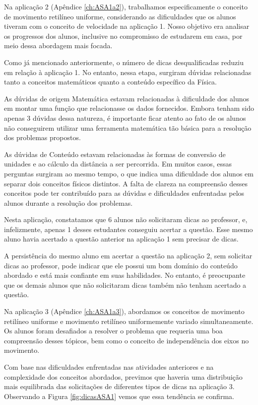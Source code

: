 Na aplicação 2 (Apêndice \ref{ch:ASA1a2}), trabalhamos especificamente o conceito de movimento retilíneo uniforme, considerando as dificuldades que os alunos tiveram com o conceito de velocidade na aplicação 1. Nosso objetivo era analisar os progressos dos alunos, inclusive no compromisso de estudarem em casa, por meio dessa abordagem mais focada.

Como já mencionado anteriormente, o número de dicas desqualificadas reduziu em relação à aplicação 1. No entanto, nessa etapa, surgiram dúvidas relacionadas tanto a conceitos matemáticos quanto a conteúdo específico da Física.

As dúvidas de origem Matemática estavam relacionadas à dificuldade dos alunos em montar uma função que relacionasse os dados fornecidos. Embora tenham sido apenas 3 dúvidas dessa natureza, é importante ficar atento ao fato de os alunos não conseguirem utilizar uma ferramenta matemática tão básica para a resolução dos problemas propostos.

As dúvidas de Conteúdo estavam relacionadas às formas de conversão de unidades e ao cálculo da distância a ser percorrida. Em muitos casos, essas perguntas surgiram ao mesmo tempo, o que indica uma dificuldade dos alunos em separar dois conceitos físicos distintos. A falta de clareza na compreensão desses conceitos pode ter contribuído para as dúvidas e dificuldades enfrentadas pelos alunos durante a resolução dos problemas. 

Nesta aplicação, constatamos que 6 alunos não solicitaram dicas ao professor, e, infelizmente, apenas 1 desses estudantes conseguiu acertar a questão. Esse mesmo aluno havia acertado a questão anterior na aplicação 1 sem precisar de dicas. 

A persistência do mesmo aluno em acertar a questão na aplicação 2, sem solicitar dicas ao professor, pode indicar que ele possui um bom domínio do conteúdo abordado e está mais confiante em suas habilidades. No entanto, é preocupante que os demais alunos que não solicitaram dicas também não tenham acertado a questão.

Na aplicação 3 (Apêndice \ref{ch:ASA1a3}), abordamos os conceitos de movimento retilíneo uniforme e movimento retilíneo uniformemente variado simultaneamente. Os alunos foram desafiados a resolver o problema que requeria uma boa compreensão desses tópicos, bem como o conceito de independência dos eixos no movimento.

Com base nas dificuldades enfrentadas nas atividades anteriores e na complexidade dos conceitos abordados, previmos que haveria uma distribuição mais equilibrada das solicitações de diferentes tipos de dicas na aplicação 3. Observando a Figura \ref{fig:dicasASA1} vemos que essa tendência se confirma.

